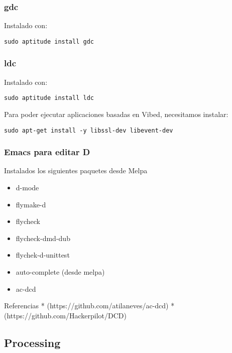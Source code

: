 \documentclass[
  12pt,
  spanish,
]{article}
\providecommand{\tightlist}{%
  \setlength{\itemsep}{0pt}\setlength{\parskip}{0pt}}
\begin{document}
\hypertarget{gdc}{%
\subsubsection{gdc}\label{gdc}}

Instalado con:

\begin{verbatim}
sudo aptitude install gdc
\end{verbatim}

\hypertarget{ldc}{%
\subsubsection{ldc}\label{ldc}}

Instalado con:

\begin{verbatim}
sudo aptitude install ldc
\end{verbatim}

Para poder ejecutar aplicaciones basadas en Vibed, necesitamos instalar:

\begin{verbatim}
sudo apt-get install -y libssl-dev libevent-dev
\end{verbatim}

\hypertarget{emacs-para-editar-d}{%
\subsubsection{Emacs para editar D}\label{emacs-para-editar-d}}

Instalados los siguientes paquetes desde Melpa

\begin{itemize}
\tightlist
\item
  d-mode
\item
  flymake-d
\item
  flycheck
\item
  flycheck-dmd-dub
\item
  flychek-d-unittest
\item
  auto-complete (desde melpa)
\item
  ac-dcd
\end{itemize}

Referencias * (https://github.com/atilaneves/ac-dcd) *
(https://github.com/Hackerpilot/DCD)

\hypertarget{processing}{%
\subsection{Processing}\label{processing}}
\end{document}
